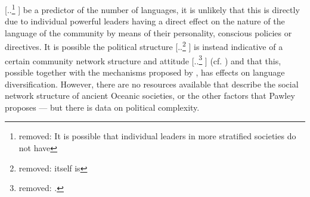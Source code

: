 \documentclass[unnumsec,webpdf,modern,medium]{oup-authoring-template}
\providecommand{\DIFaddtex}[1]{{\protect\color{blue} \sf #1}} %
\providecommand{\DIFdeltex}[1]{{\protect\color{red} [..\footnote{removed: #1} ]}} %
\providecommand{\DIFaddbegin}{} %
\providecommand{\DIFaddend}{} %
\providecommand{\DIFdelbegin}{} %
\providecommand{\DIFdelend}{} %
\providecommand{\DIFadd}[1]{\texorpdfstring{\DIFaddtex{#1}}{#1}} %
\providecommand{\DIFdel}[1]{\texorpdfstring{\DIFdeltex{#1}}{}} %
\newcommand{\DIFscaledelfig}{0.5}
\newlength{\DIFdelgraphicswidth} %
\newlength{\DIFdelgraphicsheight} %
\newcommand{\DIFaddincludegraphics}[2][]{{\color{blue}\fbox{\DIFOincludegraphics[#1]{#2}}}} %
\newcommand{\DIFdelincludegraphics}[2][]{%
\sbox{\DIFdelgraphicsbox}{\DIFOincludegraphics[#1]{#2}}%
\settoboxwidth{\DIFdelgraphicswidth}{\DIFdelgraphicsbox} %
\settoboxtotalheight{\DIFdelgraphicsheight}{\DIFdelgraphicsbox} %
\scalebox{\DIFscaledelfig}{%
\parbox[b]{\DIFdelgraphicswidth}{\usebox{\DIFdelgraphicsbox}\\[-\baselineskip] \rule{\DIFdelgraphicswidth}{0em}}\llap{\resizebox{\DIFdelgraphicswidth}{\DIFdelgraphicsheight}{%
\setlength{\unitlength}{\DIFdelgraphicswidth}%
\begin{picture}(1,1)%
\thicklines\linethickness{2pt} %
{\color[rgb]{1,0,0}\put(0,0){\framebox(1,1){}}}%
{\color[rgb]{1,0,0}\put(0,0){\line( 1,1){1}}}%
{\color[rgb]{1,0,0}\put(0,1){\line(1,-1){1}}}%
\end{picture}%
}\hspace*{3pt}}} %
} %
\DeclareRobustCommand{\DIFaddbegin}{\DIFOaddbegin \let\includegraphics\DIFaddincludegraphics} %
\DeclareRobustCommand{\DIFaddend}{\DIFOaddend \let\includegraphics\DIFOincludegraphics} %
\DeclareRobustCommand{\DIFdelbegin}{\DIFOdelbegin \let\includegraphics\DIFdelincludegraphics} %
\DeclareRobustCommand{\DIFdelend}{\DIFOaddend \let\includegraphics\DIFOincludegraphics} %
\begin{document}
\DIFdel{It is possible that individual leaders in more stratified societies do not have }\DIFdelend \DIFaddbegin \DIFadd{be a predictor of the number of languages, it is unlikely that this is directly due to individual powerful leaders having }\DIFaddend a direct effect on the nature of the language of the community by means of their personality, conscious policies or directives. It is possible the political structure \DIFdelbegin \DIFdel{itself is }\DIFdelend \DIFaddbegin \DIFadd{is instead }\DIFaddend indicative of a certain community network structure and attitude \DIFdelbegin \DIFdel{.
}\DIFdelend \DIFaddbegin \DIFadd{(cf. \citet{watts_2018}) and that this, possible together with the mechanisms proposed by \citet{pawley2007}, has effects on language diversification. However, there are no resources available that describe the social network structure of ancient Oceanic societies, or the other factors that Pawley proposes --- but there is data on political complexity. 
}\DIFaddend 
\end{document}
